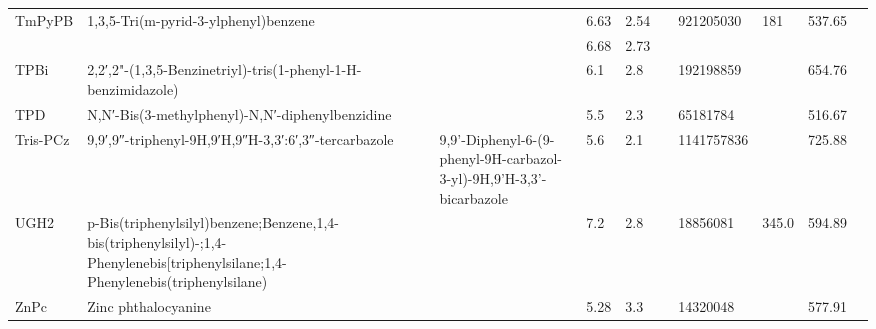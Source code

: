 \documentclass{article}
\begin{document}
\begin{landscape}
\begin{longtable}{| p{} | p{} | p{} | p{} | p{} | p{} | p{} | p{} | p{} | p{} | }
 \hline 
TmPyPB & 1,3,5-Tri(m-pyrid-3-ylphenyl)benzene &  & 6.63 & 2.54 &  & 921205030 & 181 & 537.65 &  \\ 
 & &  & 6.68 & 2.73 &  &  & & & \\ 
 
 \hline 
TPBi & 2,2′,2"-(1,3,5-Benzinetriyl)-tris(1-phenyl-1-H-benzimidazole) &  & 6.1 & 2.8 &  & 192198859 &  & 654.76 &  \\ 
 
 \hline 
TPD & N,N′-Bis(3-methylphenyl)-N,N′-diphenylbenzidine &  & 5.5 & 2.3 &  & 65181784 &  & 516.67 &  \\ 
 
 \hline 
Tris-PCz & 9,9′,9″-triphenyl-9H,9′H,9″H-3,3′:6′,3″-tercarbazole & 9,9'-Diphenyl-6-(9-phenyl-9H-carbazol-3-yl)-9H,9'H-3,3'-bicarbazole & 5.6 & 2.1 &  & 1141757836 &  & 725.88 &  \\ 
 
 \hline 
UGH2 & p-Bis(triphenylsilyl)benzene;Benzene,1,4-bis(triphenylsilyl)-;1,4-Phenylenebis[triphenylsilane;1,4-Phenylenebis(triphenylsilane) &  & 7.2 & 2.8 &  & 18856081 & 345.0 & 594.89 &  \\ 
 
 \hline 
ZnPc & Zinc phthalocyanine &  & 5.28 & 3.3 &  & 14320048 &  & 577.91 &  \\ 
 
 \hline 
\end{longtable}\end{landscape}
\end{document}
